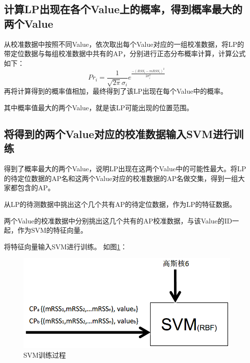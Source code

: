 \documentclass[a4paper, UTF8]{ctexart}
\begin{document}
\subsection{计算LP出现在各个Value上的概率，得到概率最大的两个Value}
从校准数据中按照不同Value，依次取出每个Value对应的一组校准数据，将LP的带定位数据与每组校准数据中共有的AP，分别进行正态分布概率计算，计算公式如下：
\begin{equation}
  Pr_{i}=\frac{1}{\sqrt{2\pi}\sigma_{i}}e^{\frac{-(RSS_{i}-mRSS_{i})^{2}}{2\sigma_{i}^{2}}}
\end{equation}
再将计算得到的概率值相加，最终得到了该LP出现在每个Value中的概率。
\par
其中概率值最大的两个Value，就是该LP可能出现的位置范围。

\subsection{将得到的两个Value对应的校准数据输入SVM进行训练}
得到了概率最大的两个Value，说明LP出现在这两个Value中的可能性最大。将LP的待定位数据的AP名和这两个Value对应的校准数据的AP名做交集，得到一组大家都包含的AP。
\par
从LP的待测数据中挑出这个几个共有AP的待定位数据，作为LP的特征数据。
\par
两个Value的校准数据中分别挑出这几个共有的AP校准数据，与该Value的ID一起，作为SVM的特征向量。
\par
将特征向量输入SVM进行训练。 如图\ref{fig:no9}：
\begin{figure}[!ht]\centering
  \includegraphics[keepaspectratio, scale=0.5]{no9.png}
  \caption{SVM训练过程\label{fig:no9}} 
\end{figure}
\end{document}
